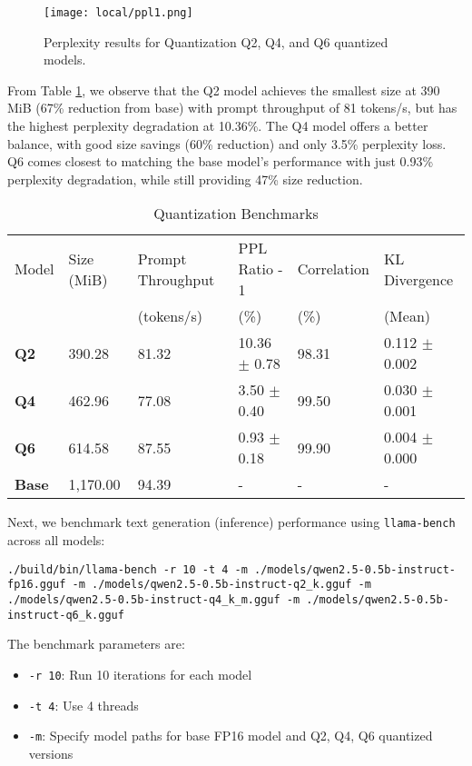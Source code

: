 \begin{figure}[H]
\centering
\texttt{[image: local/ppl1.png]}
\caption{Perplexity results for Quantization Q2, Q4, and Q6 quantized models.}
\label{fig:ppl1}
\end{figure}

From Table \ref{tab:quantization-benchmarks}, we observe that the Q2 model achieves the smallest size at 390 MiB (67\% reduction from base) with prompt throughput of 81 tokens/s, but has the highest perplexity degradation at 10.36\%. The Q4 model offers a better balance, with good size savings (60\% reduction) and only 3.5\% perplexity loss. Q6 comes closest to matching the base model's performance with just 0.93\% perplexity degradation, while still providing 47\% size reduction.

\begin{table}[H]
\centering
\caption{Quantization Benchmarks}
\label{tab:quantization-benchmarks}
\begin{tabular}{llllll}
\toprule
Model & Size (MiB) & Prompt Throughput & PPL Ratio - 1 & Correlation & KL Divergence \\
      &            & (tokens/s)        & (\%)          & (\%)        & (Mean) \\
\midrule
\textbf{Q2}    & 390.28     & 81.32               & 10.36 $\pm$ 0.78     & 98.31          & 0.112 $\pm$ 0.002     \\
\textbf{Q4}    & 462.96     & 77.08               & 3.50 $\pm$ 0.40      & 99.50          & 0.030 $\pm$ 0.001     \\
\textbf{Q6}    & 614.58     & 87.55               & 0.93 $\pm$ 0.18      & 99.90          & 0.004 $\pm$ 0.000     \\
\textbf{Base}  & 1,170.00   & 94.39               & -                & -              & -                 \\
\bottomrule
\end{tabular}
\end{table}

Next, we benchmark text generation (inference) performance using \texttt{llama-bench} across all models:

\begin{verbatim}
./build/bin/llama-bench -r 10 -t 4 -m ./models/qwen2.5-0.5b-instruct-fp16.gguf -m ./models/qwen2.5-0.5b-instruct-q2_k.gguf -m ./models/qwen2.5-0.5b-instruct-q4_k_m.gguf -m ./models/qwen2.5-0.5b-instruct-q6_k.gguf
\end{verbatim}

The benchmark parameters are:
\begin{itemize}
\item \texttt{-r 10}: Run 10 iterations for each model
\item \texttt{-t 4}: Use 4 threads
\item \texttt{-m}: Specify model paths for base FP16 model and Q2, Q4, Q6 quantized versions
\end{itemize}

